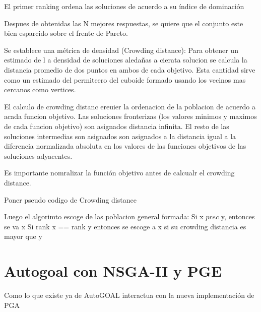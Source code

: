 El primer ranking ordena las soluciones de acuerdo a su \'indice de dominaci\'on

Despues de obtenidas las N mejores respuestas, se quiere que el conjunto este bien esparcido sobre el frente de Pareto. 

Se establece una m\'etrica de densidad (Crowding distance): Para obtener un estimado de l a densidad de soluciones aleda\~nas a cierata solucion se calcula la distancia promedio de dos puntos  en ambos  de cada objetivo. Esta cantidad sirve como un estimado del permiteero del cuboide formado usando los vecinos mas cercanos como vertices.

El calculo de crowding distanc ereuier la ordenacion de la poblacion de acuerdo a acada funcion objetivo. Las soluciones fronterizas (los valores minimos y maximos de cada funcion objetivo) son asignados distancia infinita. El resto de las soluciones intermedias son asignados son asignados a la distancia igual a la diferencia normalizada absoluta en los valores de las funciones objetivos de las soluciones adyacentes.

Es importante nomralizar la funci\'on objetivo antes de calcualr el crowding distance.

Poner pseudo codigo de Crowding distance

Luego el algorimto escoge de las poblacion general formada:
Si x $prec$ y, entonces se va x
Si rank x == rank y entonces se escoge a x si su crowding distancia es mayor que y

\section{Autogoal con NSGA-II y PGE}

Como lo que existe ya de AutoGOAL interactua con la nueva implementaci\'on de PGA
